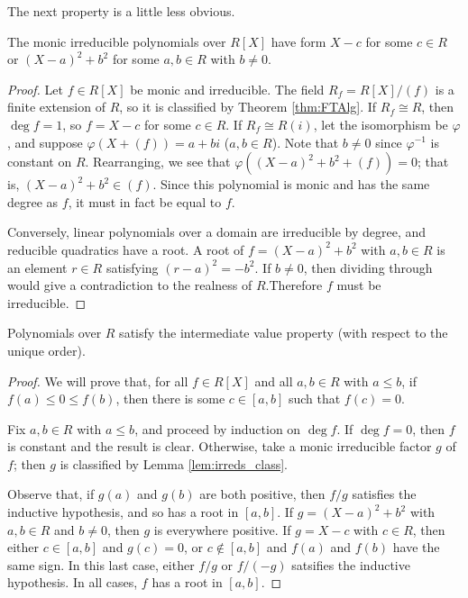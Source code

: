 The next property is a little less obvious.

\begin{lemma}
  \label{lem:irreds_class}
  \leanok
  The monic irreducible polynomials over $R[X]$ have form $X-c$ for some $c\in R$ or $(X-a)^2+b^2$ for some $a,b\in R$ with $b\neq0$.
\end{lemma}
\begin{proof}
  \leanok
  Let $f\in R[X]$ be monic and irreducible. The field $R_f=R[X]/(f)$ is a finite extension of $R$, so it is classified by Theorem \ref{thm:FTAlg}. If $R_f\cong R$, then $\deg f=1$, so $f=X-c$ for some $c\in R$. If $R_f\cong R(i)$, let the isomorphism be $\varphi$, and suppose $\varphi(X+(f))=a+bi$ ($a,b\in R$). Note that $b\neq0$ since $\varphi^{-1}$ is constant on $R$. Rearranging, we see that $\varphi((X-a)^2+b^2+(f))=0$; that is, $(X-a)^2+b^2\in(f)$. Since this polynomial is monic and has the same degree as $f$, it must in fact be equal to $f$.

  Conversely, linear polynomials over a domain are irreducible by degree, and reducible quadratics have a root. A root of $f=(X-a)^2+b^2$ with $a,b\in R$ is an element $r\in R$ satisfying $(r-a)^2=-b^2$. If $b\neq0$, then dividing through would give a contradiction to the realness of $R$.Therefore $f$ must be irreducible.
\end{proof}

\begin{lemma}
  \label{lem:IVP_poly}
  \leanok
  Polynomials over $R$ satisfy the intermediate value property (with respect to the unique order).
\end{lemma}
\begin{proof}
  \leanok
  We will prove that, for all $f\in R[X]$ and all $a,b\in R$ with $a\leq b$, if $f(a)\leq 0\leq f(b)$, then there is some $c\in[a,b]$ such that $f(c)=0$.

  Fix $a,b\in R$ with $a\leq b$, and proceed by induction on $\deg f$. If $\deg f=0$, then $f$ is constant and the result is clear. Otherwise, take a monic irreducible factor $g$ of $f$; then $g$ is classified by Lemma \ref{lem:irreds_class}.

  Observe that, if $g(a)$ and $g(b)$ are both positive, then $f/g$ satisfies the inductive hypothesis, and so has a root in $[a,b]$. If $g=(X-a)^2+b^2$ with $a,b\in R$ and $b\neq0$, then $g$ is everywhere positive. If $g=X-c$ with $c\in R$, then either $c\in[a,b]$ and $g(c)=0$, or $c\notin[a,b]$ and $f(a)$ and $f(b)$ have the same sign. In this last case, either $f/g$ or $f/(-g)$ satsifies the inductive hypothesis. In all cases, $f$ has a root in $[a,b]$.
\end{proof}

